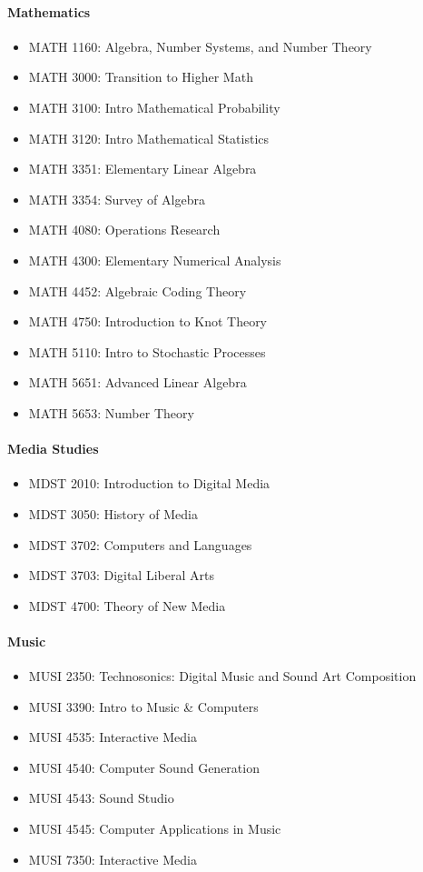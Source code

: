 \documentclass[10pt,letter]{book}
\newenvironment{itemlist}{
\begin{itemize}
\setlength{\itemsep}{0pt}
\setlength{\parskip}{0pt}}
{\end{itemize}}
\begin{document}
\paragraph{Mathematics}
\begin{itemlist}
\item MATH 1160: Algebra, Number Systems, and Number Theory
\item MATH 3000: Transition to Higher Math
\item MATH 3100: Intro Mathematical Probability
\item MATH 3120: Intro Mathematical Statistics
\item MATH 3351: Elementary Linear Algebra
\item MATH 3354: Survey of Algebra
\item MATH 4080: Operations Research
\item MATH 4300: Elementary Numerical Analysis
\item MATH 4452: Algebraic Coding Theory
\item MATH 4750: Introduction to Knot Theory
\item MATH 5110: Intro to Stochastic Processes
\item MATH 5651: Advanced Linear Algebra
\item MATH 5653: Number Theory
\end{itemlist}

\paragraph{Media Studies}
\begin{itemlist}
\item MDST 2010: Introduction to Digital Media
\item MDST 3050: History of Media
\item MDST 3702: Computers and Languages
\item MDST 3703: Digital Liberal Arts
\item MDST 4700: Theory of New Media
\end{itemlist}

\paragraph{Music}
\begin{itemlist}
\item MUSI 2350: Technosonics: Digital Music and Sound Art Composition
\item MUSI 3390: Intro to Music \& Computers
\item MUSI 4535: Interactive Media
\item MUSI 4540: Computer Sound Generation
\item MUSI 4543: Sound Studio
\item MUSI 4545: Computer Applications in Music
\item MUSI 7350: Interactive Media
\end{itemlist}
\end{document}
